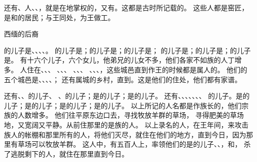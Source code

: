 {还有{}、{}人、{}、{}，就是在{}地掌权的，又有{}。这都是古时所记载的。
这些人都是窑匠，是{}和{}的居民；与王同处，为王做工。
\par }{\SH 西缅的后裔
\par }{\PP {}的儿子是{}、{}、{}、{}、{}。
的儿子是{}；{}的儿子是{}；{}的儿子是{}；
的儿子是{}；{}的儿子是{}；{}的儿子是{}。
有十六个儿子，六个女儿，他弟兄的儿女不多，他们各家不如{}族的人丁增多。
人住在{}、{}、{}、
、{}、{}、
、{}、{}、
、{}、{}、{}，这些城邑直到{}作王的时候都是属{}人的。
他们的五个城邑是{}、{}、{}、{}、{}；
还有属城的乡村，直到{}。这是他们的住处，他们都有家谱。
\par }{\PP {}还有{}、{}、{}的儿子{}、
、{}的儿子{}；{}是{}的儿子；{}是{}的儿子。
还有{}、{}、{}、{}、{}、{}、{}、
的儿子{}。{}是{}的儿子；{}是{}的儿子；{}是{}的儿子；{}是{}的儿子。
以上所记的人名都是作族长的，他们宗族的人数增多。
他们往平原东边{}口去，寻找牧放羊群的草场，
寻得肥美的草场地，又宽阔又平静。从前住那里的是{}族的人。
以上录名的人，在{}王{}年间，来攻击{}族人的帐棚和那里所有的{}人，将他们灭尽，就住在他们的地方，直到今日，因为那里有草场可以牧放羊群。
这{}人中，有五百人上{}，率领他们的是{}的儿子{}、{}、{}，和{}，
杀了逃脱剩下的{}人，就住在那里直到今日。

}
